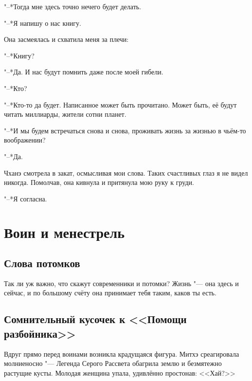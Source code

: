 \documentclass[a4paper,10pt]{book}
\newcommand{\mulang}[3]{#2}%
\begin{document}
"--*Тогда мне здесь точно нечего будет делать.

\mulang{}{"--*Я напишу о нас книгу.}
{``I'll write a book about us.''}

Она засмеялась и схватила меня за плечи:

\mulang{}{"--*Книгу?}
{``A book?''}

\mulang{}{"--*Да.} 
{``Yes.}
\mulang{}{И нас будут помнить даже после моей гибели.}
{We'll be remembered even after my death.''}

\mulang{}{"--*Кто?}
{``But who will remember?''}

\mulang{}{"--*Кто-то да будет.}
{``Somebody will.}
\mulang{}{Написанное может быть прочитано.}
{Written might be read.}
\mulang{}{Может быть, её будут читать миллиарды, жители сотни планет.}
{I guess billions of folk, habitants of hundred planets will read this story.''}

\mulang{}{"--*И мы будем встречаться снова и снова, проживать жизнь за жизнью в 
чьём-то воображении?}
{``And we'll meet and meet again, we'll live life by life in the mind's eye of 
somebody?''}

\mulang{}{"--*Да.}
{``Exactly.''}

Чханэ смотрела в закат, осмысливая мои слова. Таких счастливых глаз я не видел 
никогда. Помолчав, она кивнула и притянула мою руку к груди.

\mulang{}{"--*Я согласна.}
{``I accept it.''}

\chapter{Воин и менестрель}

\section{Слова потомков}

Так ли уж важно, что скажут современники и потомки? Жизнь "--- она здесь и сейчас, и по большому счёту она принимает тебя таким, каков ты есть.

\section{Сомнительный кусочек к <<Помощи разбойника>>}

Вдруг прямо перед воинами возникла крадущаяся фигура. Митхэ среагировала молниеносно "--- Легенда Серого Рассвета обагрила землю и безмятежно растущие кусты. Молодая женщина упала, удивлённо простонав: <<Хай?>>
\end{document}
